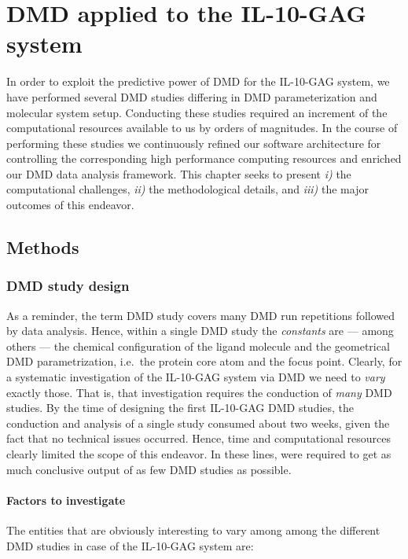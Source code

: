 \chapter{DMD applied to the IL-10-GAG system}

In order to exploit the predictive power of DMD for the IL-10-GAG system, we
have performed several DMD studies differing in DMD parameterization and
molecular system setup. Conducting these studies required an increment of the
computational resources available to us by orders of magnitudes. In the course
of performing these studies we continuously refined our software architecture
for controlling the corresponding high performance computing resources and
enriched our DMD data analysis framework. This chapter seeks to present
\textit{i)} the computational challenges, \textit{ii)} the methodological
details, and \textit{iii)} the major outcomes of this endeavor.


\section{Methods}

\subsection{DMD study design}

As a reminder, the term DMD study covers many DMD run repetitions followed by
data analysis. Hence, within a single DMD study the \textit{constants} are ---
among others --- the chemical configuration of the ligand molecule and the
geometrical DMD parametrization, i.e.\ the protein core atom and the focus
point. Clearly, for a systematic investigation of the IL-10-GAG system via DMD
we need to \textit{vary} exactly those. That is, that investigation requires the
conduction of \textit{many} DMD studies. By the time of designing the first
IL-10-GAG DMD studies, the conduction and analysis of a single study consumed
about two weeks, given the fact that no technical issues occurred. Hence, time
and computational resources clearly limited the scope of this endeavor. In these
lines, were required to get as much conclusive output of as few DMD studies as
possible.

\subsubsection{Factors to investigate}

The entities that are obviously interesting to vary among among the different
DMD studies in case of the IL-10-GAG system are:

